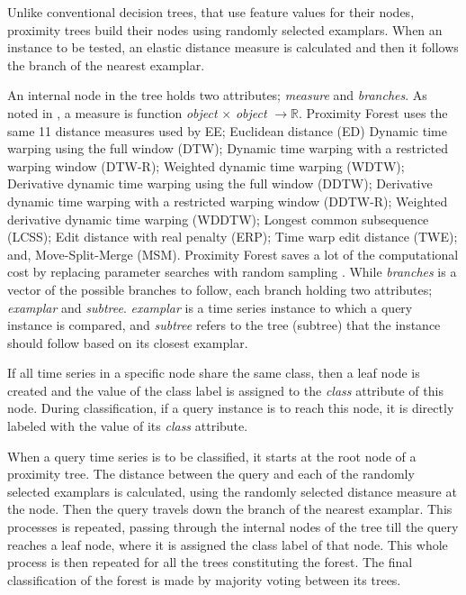 Unlike conventional decision trees, that use feature values for their nodes, proximity trees build their nodes using randomly selected examplars.
When an instance to be tested, an elastic distance measure is calculated and then it follows the branch of the nearest examplar.

An internal node in the tree holds two attributes; \emph{measure} and \emph{branches}.
As noted in \cite{lucas2019proximity}, a measure is function \emph{object} $\times$ \emph{object} $\rightarrow\mathbb{R}$.
Proximity Forest uses the same 11 distance measures used by EE; Euclidean distance (ED) Dynamic time warping using the full window (DTW);
Dynamic time warping with a restricted warping window (DTW-R); Weighted dynamic time warping (WDTW);
Derivative dynamic time warping using the full window (DDTW); Derivative dynamic time warping with a restricted warping window (DDTW-R);
Weighted derivative dynamic time warping (WDDTW); Longest common subsequence (LCSS); Edit distance with real penalty (ERP);
Time warp edit distance (TWE); and, Move-Split-Merge (MSM).
Proximity Forest saves a lot of the computational cost by replacing parameter searches with random sampling \cite{fawaz2020inceptiontime,fawaz2019deepreview}.
While \emph{branches} is a vector of the possible branches to follow, each branch holding two attributes; \emph{examplar} and \emph{subtree}.
\emph{examplar} is a time series instance to which a query instance is compared, and \emph{subtree} refers to the tree (subtree) that the instance should follow based on its closest examplar.

If all time series in a specific node share the same class, then a leaf node is created and the value of the class label is assigned to the \emph{class}
attribute of this node. During classification, if a query instance is to reach this node, it is directly labeled with the value of its \emph{class} attribute.

When a query time series is to be classified, it starts at the root node of a proximity tree.
The distance between the query and each of the randomly selected examplars is calculated, using the randomly selected distance measure at the node.
Then the query travels down the branch of the nearest examplar. This processes is repeated, passing through the internal nodes of the tree
till the query reaches a leaf node, where it is assigned the class label of that node. This whole process is then repeated for all the trees
constituting the forest. The final classification of the forest is made by majority voting between its trees.

